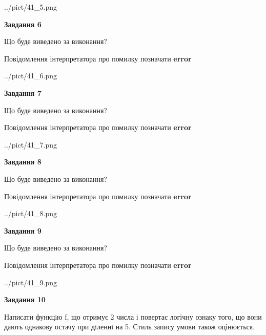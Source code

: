 \documentclass[12pt, ukrainian]{article}
\begin{document}
{\begin {large}
\begin{center}
	{../pict/41_5.png}
\end{center}
\newpage

{\begin {center}\textbf{Завдання 6}\end {center}}\par
Що буде виведено за виконання? \par
Повідомлення інтерпретатора про помилку позначати \textbf{error}

\begin{center}
	{../pict/41_6.png}
\end{center}
\newpage

{\begin {center}\textbf{Завдання 7}\end {center}}\par
Що буде виведено за виконання? \par
Повідомлення інтерпретатора про помилку позначати \textbf{error}

\begin{center}
	{../pict/41_7.png}
\end{center}
\newpage

{\begin {center}\textbf{Завдання 8}\end {center}}\par
Що буде виведено за виконання? \par
Повідомлення інтерпретатора про помилку позначати \textbf{error}

\begin{center}
	{../pict/41_8.png}
\end{center}
\newpage

{\begin {center}\textbf{Завдання 9}\end {center}}\par
Що буде виведено за виконання? \par
Повідомлення інтерпретатора про помилку позначати \textbf{error}

\begin{center}
	{../pict/41_9.png}
\end{center}
\newpage

{\begin {center}\textbf{Завдання 10}\end {center}}\par

Написати функцiю f, що отримує 2 числа і повертає логічну ознаку того, що вони дають однакову остачу при дiленнi на 5. Стиль запису умови також оцінюється.\par
\newpage

\end {large}}
\end{document}
